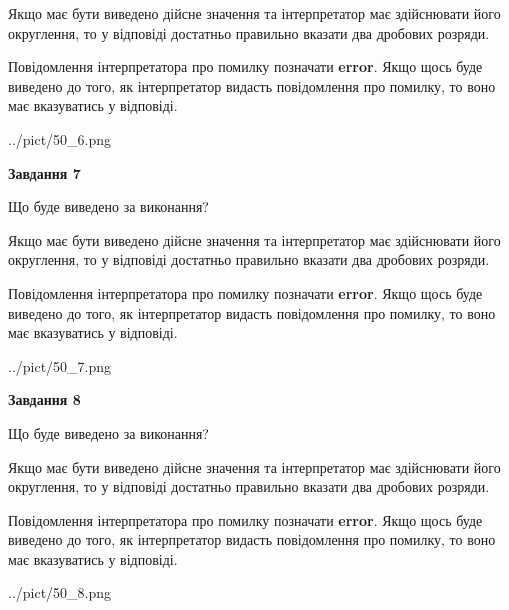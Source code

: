 \documentclass[12pt, ukrainian]{article}
\begin{document}
{\begin {Large}
Якщо має бути виведено дійсне значення та інтерпретатор має здійснювати його округлення, 
то у відповіді достатньо правильно вказати два дробових розряди.

Повідомлення інтерпретатора про помилку позначати \textbf{error}.
Якщо щось буде виведено до того, як інтерпретатор видасть повідомлення про помилку, 
то воно має вказуватись у відповіді. \par

\begin{center}
	{../pict/50_6.png}
\end{center}
\newpage

{\begin {center}\textbf{Завдання 7}\end {center}}\par
Що буде виведено за виконання? \par

Якщо має бути виведено дійсне значення та інтерпретатор має здійснювати його округлення, 
то у відповіді достатньо правильно вказати два дробових розряди.

Повідомлення інтерпретатора про помилку позначати \textbf{error}.
Якщо щось буде виведено до того, як інтерпретатор видасть повідомлення про помилку, 
то воно має вказуватись у відповіді. \par

\begin{center}
	{../pict/50_7.png}
\end{center}
\newpage

{\begin {center}\textbf{Завдання 8}\end {center}}\par
Що буде виведено за виконання? \par

Якщо має бути виведено дійсне значення та інтерпретатор має здійснювати його округлення, 
то у відповіді достатньо правильно вказати два дробових розряди.

Повідомлення інтерпретатора про помилку позначати \textbf{error}.
Якщо щось буде виведено до того, як інтерпретатор видасть повідомлення про помилку, 
то воно має вказуватись у відповіді. \par

\begin{center}
	{../pict/50_8.png}
\end{center}
\newpage


\end{Large}}
\end{document}
